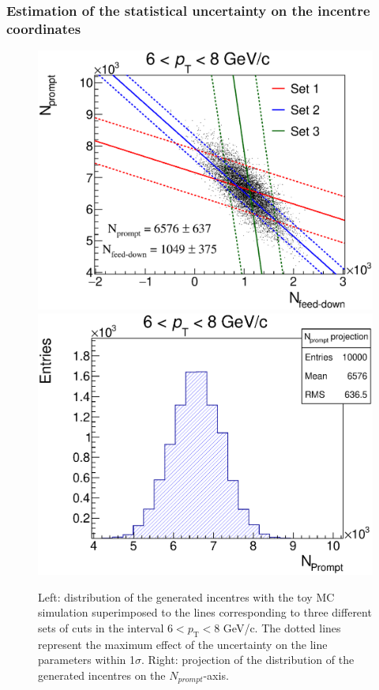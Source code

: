 \documentclass[b5paper,10pt,twoside,oldstyle,classica]{toptesi}
\newcommand{\pt}{p_\text{T}}
\begin{document}
\subsubsection{Estimation of the statistical uncertainty on the incentre coordinates}
\begin{figure}[tb]
\begin{center}
{\includegraphics[scale = 0.31]{LinesDisp_6-8.eps}}
\hspace{-0.2cm}
{\includegraphics[scale = 0.31]{Nprompt_disp_6-8.eps}}
\caption{Left: distribution of the generated incentres with the toy MC simulation superimposed to the lines corresponding to three different sets of cuts in the interval $6<\pt<8$ GeV/c. The dotted lines represent the maximum effect of the uncertainty on the line parameters within 1$\sigma$. Right: projection of the distribution of the generated incentres on the $N_{prompt}$-axis.}
\label{incerror}
\end{center}
\end{figure}
\end{document}
